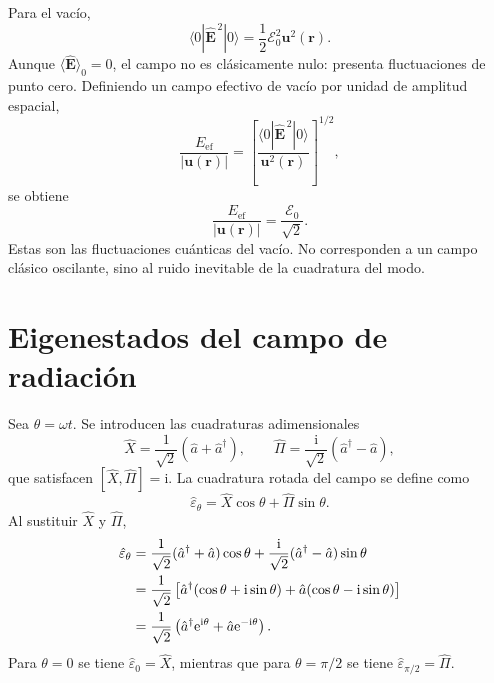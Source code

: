 \documentclass[11pt]{article}
\newcommand{\ii}{\mathrm{i}}
\newcommand{\ee}{\mathrm{e}}
\newcommand{\vb}[1]{\mathbf{#1}}
\newcommand{\adag}{\hat a^\dagger}
\newcommand{\Ezero}{\mathcal E_0}
\begin{document}
Para el vac\'io,
\begin{equation}
  \langle 0|\hat{\vb E}^{\,2}|0\rangle
  =
  \frac12 \Ezero^2\vb u^2(\vb r).
\end{equation}
Aunque $\langle \hat{\vb E}\rangle_0=0$, el campo no es cl\'asicamente nulo:
presenta fluctuaciones de punto cero. Definiendo un campo efectivo de vac\'io
por unidad de amplitud espacial,
\begin{equation}
  \frac{E_{\mathrm{ef}}}{|\vb u(\vb r)|}
  =
  \left[
  \frac{\langle 0|\hat{\vb E}^{\,2}|0\rangle}{\vb u^2(\vb r)}
  \right]^{1/2},
\end{equation}
se obtiene
\begin{equation}
  \boxed{
  \frac{E_{\mathrm{ef}}}{|\vb u(\vb r)|}
  =
  \frac{\Ezero}{\sqrt2}.
  }
\end{equation}
Estas son las fluctuaciones cu\'anticas del vac\'io. No corresponden a un
campo cl\'asico oscilante, sino al ruido inevitable de la cuadratura del modo.

\section{Eigenestados del campo de radiaci\'on}

Sea $\theta=\omega t$. Se introducen las cuadraturas adimensionales
\begin{equation}
  \hat X=\frac{1}{\sqrt2}(\hat a+\adag),
  \qquad
  \hat\Pi=\frac{\ii}{\sqrt2}(\adag-\hat a),
\end{equation}
que satisfacen $[\hat X,\hat\Pi]=\ii$. La cuadratura rotada del campo se
define como
\begin{equation}
  \hat\varepsilon_\theta
  =
  \hat X\cos\theta+\hat\Pi\sin\theta.
\end{equation}
Al sustituir $\hat X$ y $\hat\Pi$,
\begin{align}
  \hat\varepsilon_\theta
  &=
  \frac{1}{\sqrt2}(\adag+\hat a)\cos\theta
  +
  \frac{\ii}{\sqrt2}(\adag-\hat a)\sin\theta \notag\\
  &=
  \frac{1}{\sqrt2}
  \left[
    \adag(\cos\theta+\ii\sin\theta)
    +
    \hat a(\cos\theta-\ii\sin\theta)
  \right] \notag\\
  &=
  \frac{1}{\sqrt2}
  \left(\adag\ee^{\ii\theta}+\hat a\ee^{-\ii\theta}\right).
\end{align}
Para $\theta=0$ se tiene $\hat\varepsilon_0=\hat X$, mientras que para
$\theta=\pi/2$ se tiene $\hat\varepsilon_{\pi/2}=\hat\Pi$.
\end{document}
